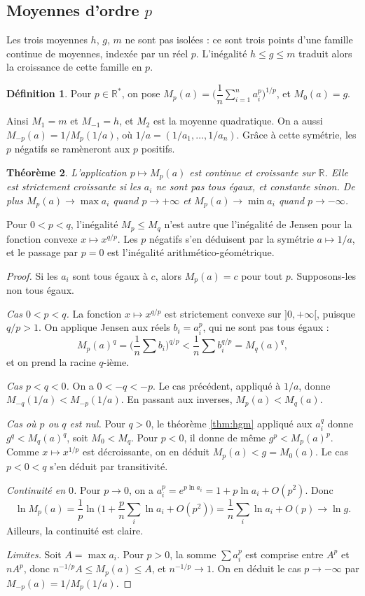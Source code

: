 \documentclass[11pt,a4paper]{article}
\theoremstyle{plain}
\newtheorem{theoreme}{Théorème}[section]
\theoremstyle{definition}
\newtheorem{definition}[theoreme]{Définition}
\theoremstyle{remark}
\newcommand{\R}{\mathbb{R}}
\begin{document}
\subsection{Moyennes d'ordre \texorpdfstring{$p$}{p}}

Les trois moyennes $h$, $g$, $m$ ne sont pas isolées : ce sont trois points d'une famille continue de moyennes, indexée par un réel $p$. L'inégalité $h\leq g\leq m$ traduit alors la croissance de cette famille en $p$.

\begin{definition}
Pour $p\in\R^*$, on pose $M_p(a)=\Big(\dfrac1n\sum_{i=1}^na_i^p\Big)^{1/p}$, et $M_0(a)=g$.
\end{definition}

Ainsi $M_1=m$ et $M_{-1}=h$, et $M_2$ est la moyenne quadratique. On a aussi $M_{-p}(a)=1/M_p(1/a)$, où $1/a=(1/a_1,\dots,1/a_n)$. Grâce à cette symétrie, les $p$ négatifs se ramèneront aux $p$ positifs.

\begin{theoreme}\label{thm:moyennes}
L'application $p\mapsto M_p(a)$ est continue et croissante sur $\R$. Elle est strictement croissante si les $a_i$ ne sont pas tous égaux, et constante sinon. De plus $M_p(a)\to\max a_i$ quand $p\to+\infty$ et $M_p(a)\to\min a_i$ quand $p\to-\infty$.
\end{theoreme}

Pour $0<p<q$, l'inégalité $M_p\leq M_q$ n'est autre que l'inégalité de Jensen pour la fonction convexe $x\mapsto x^{q/p}$. Les $p$ négatifs s'en déduisent par la symétrie $a\mapsto1/a$, et le passage par $p=0$ est l'inégalité arithmético-géométrique.

\begin{proof}
Si les $a_i$ sont tous égaux à $c$, alors $M_p(a)=c$ pour tout $p$. Supposons-les non tous égaux.

\emph{Cas $0<p<q$.} La fonction $x\mapsto x^{q/p}$ est strictement convexe sur $]0,+\infty[$, puisque $q/p>1$. On applique Jensen aux réels $b_i=a_i^p$, qui ne sont pas tous égaux :
\[
  M_p(a)^q=\Big(\frac1n\sum b_i\Big)^{q/p}<\frac1n\sum b_i^{q/p}=M_q(a)^q ,
\]
et on prend la racine $q$-ième.

\emph{Cas $p<q<0$.} On a $0<-q<-p$. Le cas précédent, appliqué à $1/a$, donne $M_{-q}(1/a)<M_{-p}(1/a)$. En passant aux inverses, $M_p(a)<M_q(a)$.

\emph{Cas où $p$ ou $q$ est nul.} Pour $q>0$, le théorème \ref{thm:hgm} appliqué aux $a_i^q$ donne $g^q<M_q(a)^q$, soit $M_0<M_q$. Pour $p<0$, il donne de même $g^p<M_p(a)^p$. Comme $x\mapsto x^{1/p}$ est décroissante, on en déduit $M_p(a)<g=M_0(a)$. Le cas $p<0<q$ s'en déduit par transitivité.

\emph{Continuité en $0$.} Pour $p\to0$, on a $a_i^p=e^{p\ln a_i}=1+p\ln a_i+O(p^2)$. Donc
\[
  \ln M_p(a)=\frac1p\ln\Big(1+\frac pn\sum_i\ln a_i+O(p^2)\Big)=\frac1n\sum_i\ln a_i+O(p)\longrightarrow\ln g .
\]
Ailleurs, la continuité est claire.

\emph{Limites.} Soit $A=\max a_i$. Pour $p>0$, la somme $\sum a_i^p$ est comprise entre $A^p$ et $nA^p$, donc $n^{-1/p}A\leq M_p(a)\leq A$, et $n^{-1/p}\to1$. On en déduit le cas $p\to-\infty$ par $M_{-p}(a)=1/M_p(1/a)$.
\end{proof}
\end{document}
